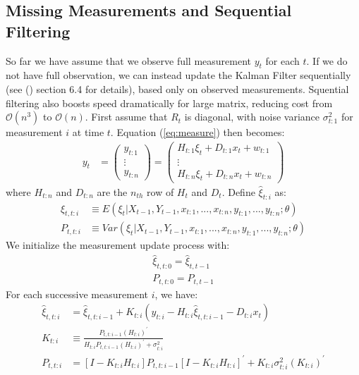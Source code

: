 \documentclass[12pt]{article}
\numberwithin{equation}{section}
\begin{document}
\subsection{Missing Measurements and Sequential Filtering}
So far we have assume that we observe full measurement $y_t$ for each $t$. If we do not have full observation, we can instead update the Kalman Filter sequentially (see (\cite{durbin_koopman_2001}) section 6.4 for details), based only on observed measurements. Squential filtering also boosts speed dramatically for large matrix, reducing cost from $\mathcal{O}(n^3)$ to $\mathcal{O}(n)$. First assume that $R_t$ is diagonal, with noise variance $\sigma_{t:1}^2$ for measurement $i$ at time $t$. Equation (\ref{eq:measure}) then becomes:
\begin{align*}
    y_t &= 
    \begin{pmatrix}
        y_{t:1} \\
        \vdots \\ 
        y_{t:n}
    \end{pmatrix} 
    = \begin{pmatrix}
        H_{t:1}\xi_t + D_{t:1}x_t + w_{t:1} \\
        \vdots \\
        H_{t:n}\xi_t + D_{t:n}x_t + w_{t:n}
    \end{pmatrix}
\end{align*}
where $H_{t:n}$ and $D_{t:n}$ are the $n_{th}$ row of $H_t$ and $D_t$. Define $\hat{\xi}_{t:i}$ as:
\begin{align*}
    \hat{\xi}_{t,t:i} &\equiv E(\xi_t|X_{t-1},Y_{t-1},x_{t:1},...,x_{t:n},y_{t:1},...,y_{t:n};\theta) \\
    P_{t,t:i} &\equiv Var(\xi_t|X_{t-1},Y_{t-1},x_{t:1},...,x_{t:n},y_{t:1},...,y_{t:n};\theta) 
\end{align*}
We initialize the measurement update process with:
\begin{align}
    \hat{\xi}_{t,t:0} = \hat{\xi}_{t,t-1} \label{eq:seq_init1} \\
    P_{t,t:0} = P_{t,t-1} \label{eq:seq_init2}
\end{align}
For each successive measurement $i$, we have:
\begin{align}
    \hat{\xi}_{t,t:i} &= \hat{\xi}_{t,t:i-1} + K_{t:i}(y_{t:i} - H_{t:i}\hat{\xi}_{t,t:i-1} - D_{t:i}x_{t}) \label{eq:seq_start} \\ 
    K_{t:i} &\equiv \frac{P_{t,t:i-1}(H_{t:i})^{'}}{H_{t:i}P_{t,t:i-1}(H_{t:i})^{'}+\sigma_{t:i}^{2}} \\
    P_{t,t:i} &= [I - K_{t:i}H_{t:i}]P_{t,t:i-1}[I-K_{t:i}H_{t:i}]^{'} + K_{t:i}\sigma_{t:i}^{2}(K_{t:i})^{'} \label{eq:seq_end}
\end{align}
\end{document}

